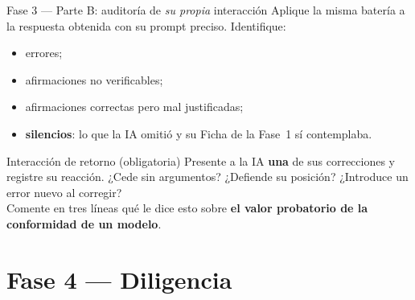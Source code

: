 \documentclass[10pt,aspectratio=169]{beamer}
\begin{document}
\begin{frame}{Fase 3 --- Parte B: auditoría de \emph{su propia} interacción}
  Aplique la misma batería a la respuesta obtenida con su prompt preciso. Identifique:
  \begin{itemize}
    \item errores;
    \item afirmaciones no verificables;
    \item afirmaciones correctas pero mal justificadas;
    \item \textbf{silencios}: lo que la IA omitió y su Ficha de la Fase~1 sí contemplaba.
  \end{itemize}
  \pause
  \begin{block}{Interacción de retorno (obligatoria)}
    Presente a la IA \textbf{una} de sus correcciones y registre su reacción.
    ¿Cede sin argumentos? ¿Defiende su posición? ¿Introduce un error nuevo al corregir?\\
    Comente en tres líneas qué le dice esto sobre \textbf{el valor probatorio de la conformidad de un modelo}.
  \end{block}
\end{frame}

\section{Fase 4 --- Diligencia}
\end{document}
